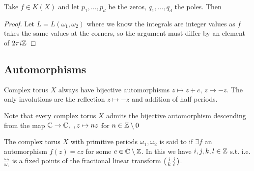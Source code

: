 \documentclass{article}
\begin{document}
\begin{prop}
	Take $f \in K(X)$ and let $p_1, \dots, p_d$ be the zeros, $q_1, \dots, q_d$ the poles. Then 
\end{prop}
\begin{proof}
	Let $L = L(\omega_1, \omega_2)$
	where we know the integrals are integer values as $f$ takes the same values at the corners, so the argument must differ by an element of $2\pi i \mathbb{Z}$
\end{proof}

\subsection{Automorphisms}

\begin{prop}
	Complex torus $X$ always have bijective automorphisms $z \mapsto z+c, \, z \mapsto -z$. The only involutions are the reflection $z \mapsto -z$ and addition of half periods. 
\end{prop}

\begin{remark}
	Note that every complex torus $X$ admits the bijective automorphism descending from the map $\mathbb{C} \to \mathbb{C}, \ ,z \mapsto n z$ for $n \in \mathbb{Z}\setminus 0$
\end{remark}

\begin{definition}
	The complex torus $X$ with primitive periods $\omega_1, \omega_2$ is said to  if $\exists f$ an automorphism $f(z) = cz$ for some $c \in \mathbb{C}\setminus\mathbb{Z}$. In this we have $i,j,k,l \in \mathbb{Z}$ s.t.
	i.e. $\frac{\omega_2}{\omega_1}$ is a fixed points of the fractional linear transform $\begin{psmallmatrix} i & j \\ k & l \end{psmallmatrix}$. 
\end{definition}
\end{document}
